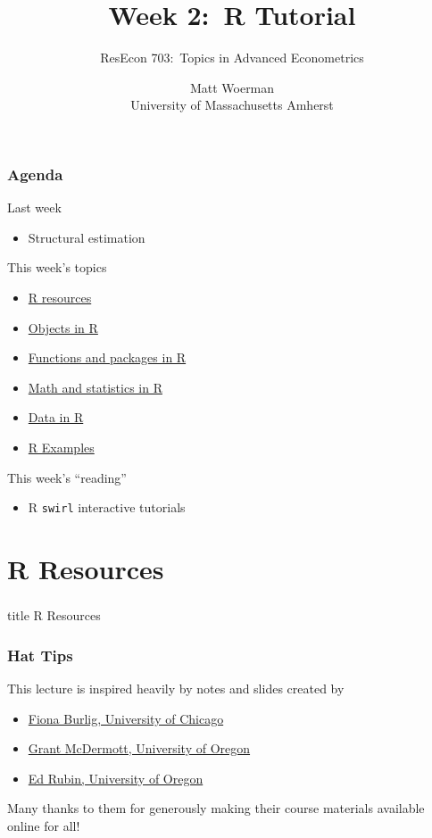 \documentclass{beamer}\usepackage[]{graphicx}\usepackage[]{color}
\title[Week 2:\ R Tutorial]{Week 2:\ R Tutorial}
\author[ResEcon 703:\ Advanced Econometrics]{ResEcon 703:\ Topics in Advanced Econometrics}
\date{Matt Woerman\\University of Massachusetts Amherst}
\begin{document}
{ 
\begin{frame}[noframenumbering]
    \titlepage
\end{frame}
}

\begin{frame}\frametitle{Agenda}
    Last week
    \begin{itemize}
        \item Structural estimation
    \end{itemize}
    \vspace{2ex}
    This week's topics
    \begin{itemize}
    	\item \hyperlink{page.\getpagerefnumber{resources}}{R resources}
        \item \hyperlink{page.\getpagerefnumber{objects}}{Objects in R}
        \item \hyperlink{page.\getpagerefnumber{functions}}{Functions and packages in R}
        \item \hyperlink{page.\getpagerefnumber{math}}{Math and statistics in R}
        \item \hyperlink{page.\getpagerefnumber{data}}{Data in R}
        \item \hyperlink{page.\getpagerefnumber{examples}}{R Examples}
    \end{itemize}
    \vspace{2ex}
    This week's ``reading''
    \begin{itemize}
        \item R \texttt{swirl} interactive tutorials
    \end{itemize}
\end{frame}

\section{R Resources}
\label{resources}
\begin{frame}\frametitle{}
    \vfill
    \centering
    \begin{beamercolorbox}[center]{title}
        \Large R Resources
    \end{beamercolorbox}
    \vfill
\end{frame}

\begin{frame}\frametitle{Hat Tips}
    This lecture is inspired heavily by notes and slides created by
    \begin{itemize}
        \item \href{https://www.fionaburlig.com/}{Fiona Burlig, University of Chicago}
        \item \href{https://grantmcdermott.com/}{Grant McDermott, University of Oregon}
        \item \href{http://edrub.in/}{Ed Rubin, University of Oregon}
    \end{itemize}
    \vspace{3ex}
    Many thanks to them for generously making their course materials available online for all!
\end{frame}
\end{document}
